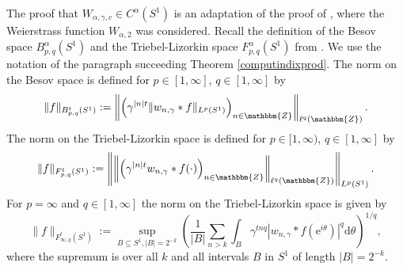 \documentclass[10pt]{amsart}
\theoremstyle{remark}
\theoremstyle{definition}
\begin{document}
The proof that $W_{\alpha,\gamma,c}\in C^\alpha(S^1)$ is an adaptation of the proof of \cite[Theorem $4.9$, Chapter II]{zygbook}, where the Weierstrass function $W_{\alpha,2}$ was considered. Recall the definition of the Besov space $B^\alpha_{p,q}(S^1)$ and the Triebel-Lizorkin space $F^\alpha_{p,q}(S^1)$ from \cite{peller}. We use the notation of the paragraph succeeding Theorem \ref{computindixprod}. The norm on the Besov space is defined for $p\in [1,\infty]$, $q\in [1,\infty]$ by
$$\|f\|_{B^t_{p,q}(S^1)}:=\left\|\left(\gamma^{|n|t}\|w_{n,\gamma}*f\|_{L^p(S^1)}\right)_{n\in {\mathbbm{Z}}}\right\|_{\ell^q({\mathbbm{Z}})}.$$
The norm on the Triebel-Lizorkin space is defined for $p\in [1,\infty)$, $q\in [1,\infty]$ by
$$\|f\|_{F^t_{p,q}(S^1)}:=\left\|\left\|\left(\gamma^{|n|t}w_{n,\gamma}*f(\cdot)\right)_{n\in {\mathbbm{Z}}}\right\|_{\ell^q({\mathbbm{Z}})}\right\|_{L^p(S^1)}.$$
For $p=\infty$ and $q\in [1,\infty]$ the norm on the Triebel-Lizorkin space is given by
$$\|f\|_{F^t_{\infty,q}(S^1)}:=\sup_{B\subseteq S^1, |B|=2^{-k}}\left(\frac{1}{|B|}\sum _{n>k} \int_B \gamma^{tnq}|w_{n,\gamma}*f({\mathrm{e}}^{i\theta})|^q{\mathrm{d}} \theta\right)^{1/q},$$
where the supremum is over all $k$ and all intervals $B$ in $S^1$ of length $|B|=2^{-k}$.
\end{document}
